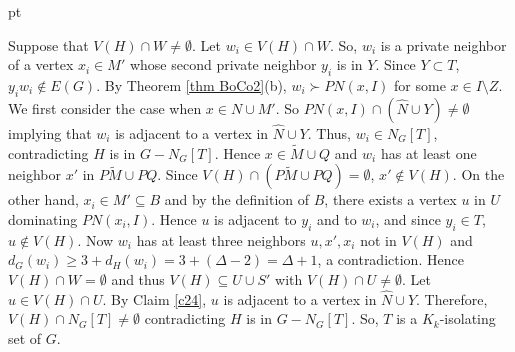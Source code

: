 \documentclass[11pt]{article}
\newcommand{\2}{ \vspace{0.2cm} }
\newcommand{\1}{ \vspace{0.1cm} }
\begin{document}
 pt

\indent Suppose that $V(H) \cap W \neq \emptyset$. Let $w_{i} \in V(H) \cap W$. So, $w_{i}$ is a private neighbor of a vertex $x_{i} \in M'$ whose second private neighbor $y_i$ is in $Y$. Since $Y \subset T$, $y_{i}w_{i} \notin E(G)$. By Theorem \ref{thm BoCo2}(b), $w_{i} \succ PN(x, I)$ for some $x \in I \setminus Z$. We first consider the case when $x \in N \cup M'$. So $PN(x, I) \cap (\hat{N} \cup Y) \neq \emptyset$ implying that $w_{i}$ is adjacent to a vertex in $\hat{N} \cup Y$. Thus, $w_{i} \in N_{G}[T]$, contradicting $H$ is in $G - N_{G}[T]$. Hence $x \in \tilde{M} \cup Q$ and $w_i$ has at least one neighbor $x'$ in $P\tilde M \cup PQ$. Since $V(H)\cap (P\tilde M \cup PQ)=\emptyset$, $x' \notin V(H).$
On the other hand, $x_i \in M'\subseteq B$ and by the definition of $B$, there exists a vertex $u$ in $U$ dominating $PN(x_i,I).$ Hence  $u$ is adjacent to $y_i$ and to $w_i$, and since $y_i \in T$, $u\notin V(H)$. Now $w_i$ has at least three neighbors $u, x', x_i$ not in $V(H)$ and $d_G(w_i)\ge 3+ d_H(w_i)=3+(\Delta -2)=\Delta +1$, a contradiction. Hence $V(H)\cap W=\emptyset$ and thus $V(H) \subseteq U \cup S'$ with $V(H)\cap U \neq \emptyset$.
Let $u \in V(H) \cap U$. By Claim \ref{c24}, $u$ is adjacent to a vertex in $\hat{N} \cup Y$. Therefore, $V(H) \cap N_{G}[T] \neq \emptyset$ contradicting $H$ is in $G - N_{G}[T]$. So, $T$ is a $K_{k}$-isolating set of $G$.


\end{document}
